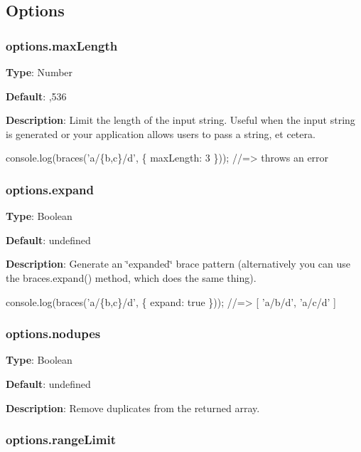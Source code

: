 \subsection*{Options}

\subsubsection*{options.\+max\+Length}

{\bfseries Type}\+: {\ttfamily Number}

{\bfseries Default}\+: {,536}

{\bfseries Description}\+: Limit the length of the input string. Useful when the input string is generated or your application allows users to pass a string, et cetera.


\begin{DoxyCode}
console.log(braces('a/\{b,c\}/d', \{ maxLength: 3 \}));  //=> throws an error
\end{DoxyCode}


\subsubsection*{options.\+expand}

{\bfseries Type}\+: {\ttfamily Boolean}

{\bfseries Default}\+: {\ttfamily undefined}

{\bfseries Description}\+: Generate an \char`\"{}expanded\char`\"{} brace pattern (alternatively you can use the {\ttfamily braces.\+expand()} method, which does the same thing).


\begin{DoxyCode}
console.log(braces('a/\{b,c\}/d', \{ expand: true \}));
//=> [ 'a/b/d', 'a/c/d' ]
\end{DoxyCode}


\subsubsection*{options.\+nodupes}

{\bfseries Type}\+: {\ttfamily Boolean}

{\bfseries Default}\+: {\ttfamily undefined}

{\bfseries Description}\+: Remove duplicates from the returned array.

\subsubsection*{options.\+range\+Limit}


